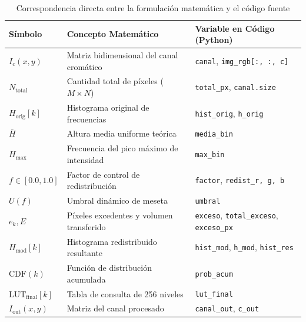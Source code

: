 \documentclass{article}
\begin{document}
\begin{table}[H]
    \centering
    \caption{Correspondencia directa entre la formulación matemática y el código fuente}
    \label{tab:equivalencias}
    \small
    \begin{tabularx}{\textwidth}{l >{\raggedright\arraybackslash}p{5.5cm} >{\raggedright\arraybackslash}X}
        \toprule
        \textbf{Símbolo} & \textbf{Concepto Matemático} & \textbf{Variable en Código (Python)} \\
        \midrule
        $I_c(x, y)$ & Matriz bidimensional del canal cromático & \texttt{canal}, \texttt{img\_rgb[:, :, c]} \\
        $N_{\text{total}}$ & Cantidad total de píxeles ($M \times N$) & \texttt{total\_px}, \texttt{canal.size} \\
        $H_{\text{orig}}[k]$ & Histograma original de frecuencias & \texttt{hist\_orig}, \texttt{h\_orig} \\
        $\bar{H}$ & Altura media uniforme teórica & \texttt{media\_bin} \\
        $H_{\max}$ & Frecuencia del pico máximo de intensidad & \texttt{max\_bin} \\
        $f \in [0.0, 1.0]$ & Factor de control de redistribución & \texttt{factor}, \texttt{redist\_r, g, b} \\
        $U(f)$ & Umbral dinámico de meseta & \texttt{umbral} \\
        $e_k, E$ & Píxeles excedentes y volumen transferido & \texttt{exceso}, \texttt{total\_exceso}, \texttt{exceso\_px} \\
        $H_{\text{mod}}[k]$ & Histograma redistribuido resultante & \texttt{hist\_mod}, \texttt{h\_mod}, \texttt{hist\_res} \\
        $\text{CDF}(k)$ & Función de distribución acumulada & \texttt{prob\_acum} \\
        $\text{LUT}_{\text{final}}[k]$ & Tabla de consulta de 256 niveles & \texttt{lut\_final} \\
        $I_{\text{out}}(x, y)$ & Matriz del canal procesado & \texttt{canal\_out}, \texttt{c\_out} \\
        \bottomrule
    \end{tabularx}
\end{table}
\end{document}
